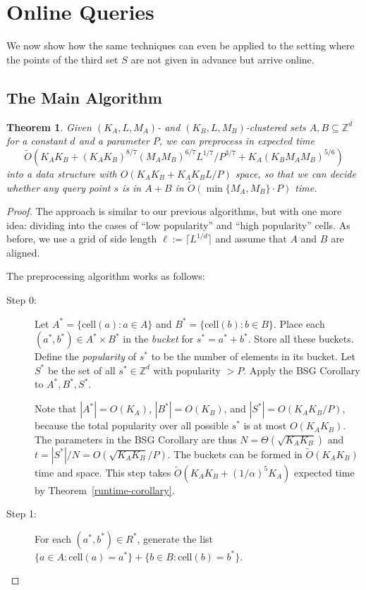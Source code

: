 \documentclass[11pt]{article}
\newcommand{\LONG}[1]{#1}\newcommand{\SHORT}[1]{}
\newtheorem{theorem}{Theorem}[section]
\newcommand{\Z}{\mathbb{Z}}
\newcommand{\OO}{\widetilde{O}}
\newcommand{\CELL}{\textrm{cell}}
\begin{document}
\LONG{
\section{Online Queries}\label{sec:online}

We now show how the same techniques can even
be applied to the setting where the points of the third set $S$ are not
given in advance but arrive online.

\subsection{The Main Algorithm}

\begin{theorem}\label{thm-cluster-online}
Given $(K_A,L,M_A)$- and $(K_B,L,M_B)$-clustered sets $A,B\subseteq\Z^d$ for a constant $d$ and a parameter $P$,
we can preprocess in expected time
$$\OO(K_AK_B +  (K_AK_B)^{8/7}(M_AM_B)^{6/7}L^{1/7}/P^{3/7}
  + K_A(K_BM_AM_B)^{5/6})$$
into a data structure with $O(K_AK_B + K_AK_BL/P)$ space,
so that we can decide whether any query point $s$ is in $A+B$
in $\OO(\min\{M_A,M_B\}\cdot P)$ time.
\end{theorem}
\begin{proof}
The approach is similar to our previous algorithms, but with
one more idea: dividing into the cases of ``low popularity''
and ``high popularity'' cells.
As before, we use a grid of side length $\ell := \lceil L^{1/d} \rceil$ and assume
that $A$ and $B$ are aligned.

The preprocessing algorithm works as follows:
\begin{description}
\item[Step 0:] Let $A^*=\{\CELL(a):a\in A\}$ and
$B^*=\{\CELL(b):b\in B\}$.
Place each $(a^*,b^*)\in A^*\times B^*$
in the \emph{bucket} for $s^*=a^*+b^*$.  Store all these
buckets.  Define the \emph{popularity}
of $s^*$ to be the number of elements in its
bucket.  Let $S^*$ be the set of all $s^*\in \Z^d$
with popularity $>P$.
Apply the BSG Corollary to $A^*,B^*,S^*$.

Note that $|A^*|=O(K_A)$, $|B^*|=O(K_B)$, and $|S^*|=O(K_AK_B/P)$, because
the total popularity over all possible $s^*$ is
at most $O(K_AK_B)$.  The parameters in the BSG Corollary
are thus $N=\Theta(\sqrt{K_AK_B})$ and $t=|S^*|/N = O(\sqrt{K_AK_B}/P)$.
The buckets can be formed in $\OO(K_AK_B)$ time and space.
This step takes $\OO(K_AK_B + (1/\alpha)^5 K_A)$ expected time
by Theorem~\ref{runtime-corollary}.
\item[Step 1:]
For each $(a^*,b^*)\in R^*$, generate the list
$\{a\in A: \CELL(a)=a^*\} + \{b\in B: \CELL(b)=b^*\}$.


\end{description}
\end{proof}}
\end{document}
